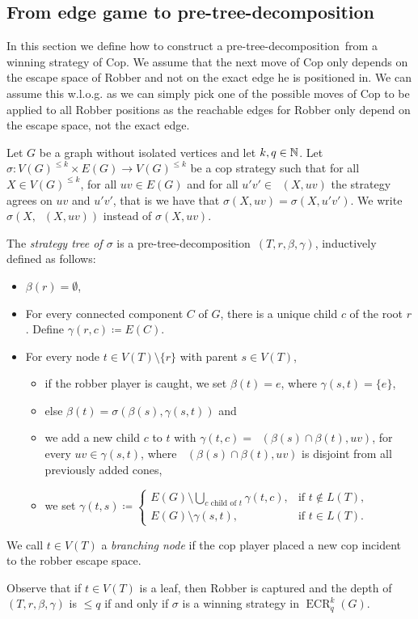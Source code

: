 \documentclass{lmcs}
\theoremstyle{plain}\newtheorem{claim}[thm]{Claim}   %
\newcommand{\NN}{\ensuremath \mathbb{N}}
\DeclareMathOperator{\eCR}{ECR}
\newcommand{\eCRkq}{\eCR^k_q}
\DeclareMathOperator{\escapeE}{comp_E}
\newcommand{\preTreeDec}{pre-tree-decomposition}
\begin{document}
\subsection{From edge game to \preTreeDec}\label{sec:game}

In this section we define how to construct a \preTreeDec\ from a winning strategy of Cop.
We assume that the next move of Cop only depends on the escape space of Robber and not on the exact edge he is positioned in.
We can assume this w.l.o.g. as we can simply pick one of the possible moves of Cop to be applied to all Robber positions as the reachable edges for Robber only depend on the escape space, not the exact edge.

\begin{defi}
	\label{def:strat-tree}
	Let $G$ be a graph without isolated vertices and let $k,q\in\NN$.
	Let $\sigma\colon V(G)^{\leq k}\times E(G)\rightarrow V(G)^{\leq k}$ be a cop strategy such that for all $X\in V(G)^{\leq k}$, for all $uv\in E(G)$ and for all $u'v'\in\escapeE(X,{uv})$ the strategy agrees on $uv$ and $u'v'$, that is we have that $\sigma(X,uv)=\sigma(X,u'v')$.
	We write $\sigma(X,\escapeE(X,{uv}))$ instead of $\sigma(X,uv)$.
	
	The \emph{strategy tree of $\sigma$} is a \preTreeDec\ $(T,r,\beta,\gamma)$, inductively defined as follows:
	\begin{itemize}
		\item $\beta(r)=\emptyset$,
		\item For every connected component $C$ of $G$, there is a unique child $c$ of the root $r$. Define $\gamma(r,c) \coloneqq E(C)$.
		\item For every node $t\in V(T)\setminus\{r\}$ with parent $s\in V(T)$,
		\begin{itemize}
			\item if the robber player is caught, we set $\beta(t)= e$, where $\gamma(s,t)=\{e\}$,
			\item else $\beta(t)=\sigma(\beta(s),\gamma(s,t))$ and
			\item we add a new child $c$ to $t$ with $\gamma(t,c)=\escapeE(\beta(s)\cap\beta(t),uv)$, for every $uv\in\gamma(s,t)$, where $\escapeE(\beta(s)\cap\beta(t),uv)$ is disjoint from all previously added cones,
			\item we set $\gamma(t,s)\coloneqq
			\begin{cases}
				E(G)\setminus \bigcup_{c \text{ child of }t}\gamma(t,c), &\text{if } t\notin L(T),\\
				E(G)\setminus\gamma(s,t), &\text{if } t\in L(T).
			\end{cases}$
		\end{itemize}
	\end{itemize}
	We call $t\in V(T)$ a \emph{branching node} if the cop player placed a new cop incident to the robber escape space.
	
	Observe that if $t\in V(T)$ is a leaf, then Robber is captured and the depth of $(T,r,\beta,\gamma)$ is $\leq q$ if and only if $\sigma$ is a winning strategy in $\eCRkq(G)$.
\end{defi}
\end{document}
